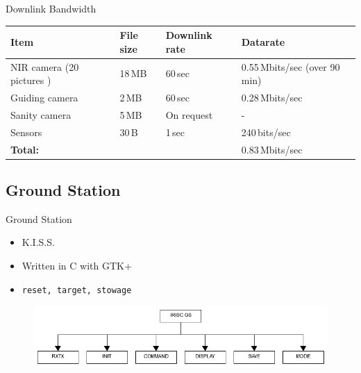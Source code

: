 \documentclass[11pt, aspectratio=169]{beamer}
\begin{document}
\begin{frame}[c]{Downlink Bandwidth}
\centering
\hspace*{-.3cm}
\begin{tabular}{| l | l | l | l |}
	\hline
	\textbf{Item} & \textbf{File size} & \textbf{Downlink rate} & \textbf{Datarate} \\\hline\hline
	
	NIR camera (20 pictures ) & 18\,MB & 60\,sec & 0.55\,Mbits/sec (over 90 min) \\\hline
	Guiding camera		   & 2\,MB	& 60\,sec	& 0.28\,Mbits/sec \\\hline
	Sanity camera		   & 5\,MB  & On request& - \\\hline
	Sensors				   & 30\,B  & 1\,sec 	& 240\,bits/sec \\\hline\hline
	\textbf{Total:} 	   &		& 			& 0.83\,Mbits/sec \\\hline
	

\end{tabular}
\end{frame}

\subsection{Ground Station} 	%
\begin{frame}{Ground Station}
\begin{itemize}
	\item K.I.S.S.
	\item Written in C with GTK+
	\item \texttt{reset, target, stowage}
\end{itemize}
\begin{figure}
	\includegraphics[scale=0.4]{figures/images/GSS-tree.png}
\end{figure}
\end{frame}
\end{document}
